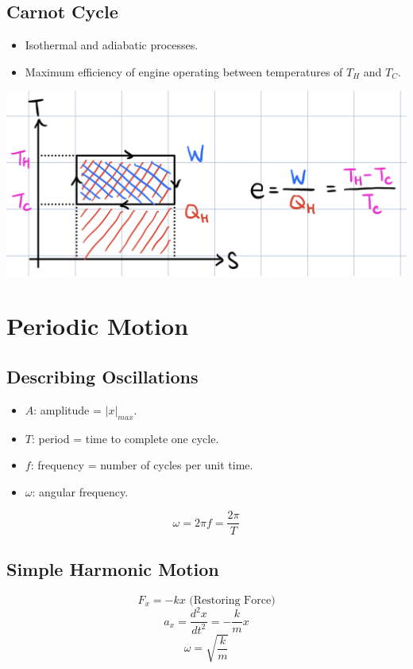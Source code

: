 \documentclass{article}
\begin{document}
\subsection{Carnot Cycle}
\begin{itemize}
    \item Isothermal and adiabatic processes.
    \item Maximum efficiency of engine operating between temperatures of $T_H$ and $T_C$.
\end{itemize}
\begin{center}
    \includegraphics[scale=0.1]{images/carnot_cycle.jpg}
\end{center}

\section{Periodic Motion}

\subsection{Describing Oscillations}
\begin{itemize}
    \item $A$: amplitude = $|x|_{max}$.
    \item $T$: period = time to complete one cycle.
    \item $f$: frequency = number of cycles per unit time.
    \item $\omega$: angular frequency.
\end{itemize}
\[\omega=2\pi f=\frac{2\pi}{T}\]

\subsection{Simple Harmonic Motion}
\[F_x=-kx \text{ (Restoring Force)}\]
\[a_x=\frac{d^2x}{dt^2}=-\frac{k}{m}x\]
\[\omega=\sqrt{\frac{k}{m}}\]
\end{document}
